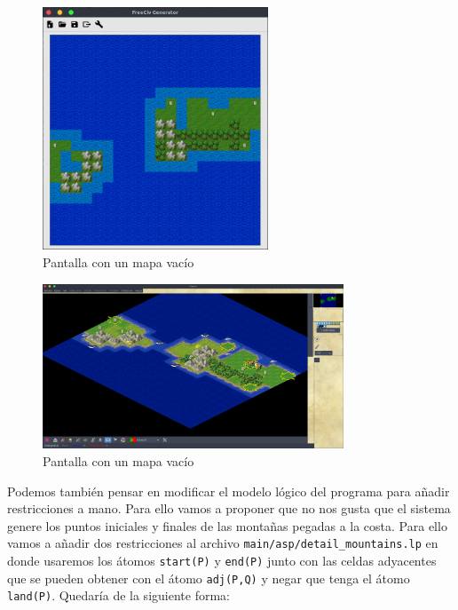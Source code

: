 \begin{figure}[!h]
	\centering
	\includegraphics[width=0.6\textwidth]{images/example-5-user.png}
	\caption{Pantalla con un mapa vacío}
	\label{fig:exampleexecution}
\end{figure}

\begin{figure}[!h]
	\centering
	\includegraphics[width=0.8\textwidth]{images/freeciv-example.png}
	\caption{Pantalla con un mapa vacío}
	\label{fig:freecivscreen}
\end{figure}

\clearpage

Podemos también pensar en modificar el modelo lógico del programa para añadir restricciones a mano. Para ello vamos a proponer que no nos gusta que el sistema genere los puntos iniciales y finales de las montañas pegadas a la costa. Para ello vamos a añadir dos restricciones al archivo \texttt{main/asp/detail\_mountains.lp} en donde usaremos los átomos \texttt{start(P)} y \texttt{end(P)} junto con las celdas adyacentes que se pueden obtener con el átomo \texttt{adj(P,Q)} y negar que tenga el átomo \texttt{land(P)}. Quedaría de la siguiente forma:


